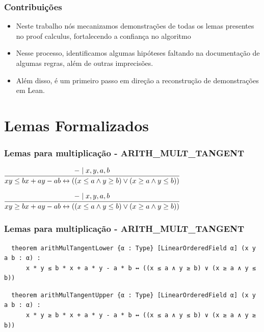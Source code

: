 \documentclass[usepdftitle=false,aspectratio=169,usenames,dvipsnames]{beamer}
\newcommand\vitem{\vfill\item}
\begin{document}
\begin{frame}
  \frametitle{Contribuições}
  \begin{itemize}
    \item Neste trabalho nós mecanizamos demonstrações de todas os lemas presentes no proof calculus, fortalecendo a confiança no algoritmo
    \vitem Nesse processo, identificamos algumas hipóteses faltando na documentação de algumas regras, além de outras imprecisões.
    \vitem Além disso, é um primeiro passo em direção a reconstrução de demonstrações em Lean.

  \end{itemize}
\end{frame}

\section{Lemas Formalizados}


\begin{frame}
  \frametitle{Lemas para multiplicação - ARITH\_MULT\_TANGENT}

\begin{center}
  $\infer[]{xy \le bx + ay - ab \leftrightarrow ((x \le a \land y \ge b) \lor (x \ge a \land y \le b))}{- \mid x, y, a, b}$
\end{center}

\begin{center}
  $\infer[]{xy \ge bx + ay - ab \leftrightarrow ((x \le a \land y \le b) \lor (x \ge a \land y \ge b))}{- \mid x, y, a, b}$
\end{center}

\end{frame}

\begin{frame}[fragile]
  \frametitle{Lemas para multiplicação - ARITH\_MULT\_TANGENT}

  \begin{lstlisting}
  theorem arithMulTangentLower {α : Type} [LinearOrderedField α] (x y a b : α) :
      x * y ≤ b * x + a * y - a * b ↔ ((x ≤ a ∧ y ≥ b) ∨ (x ≥ a ∧ y ≤ b))
  \end{lstlisting}

  \begin{lstlisting}
  theorem arithMulTangentUpper {α : Type} [LinearOrderedField α] (x y a b : α) :
      x * y ≥ b * x + a * y - a * b ↔ ((x ≤ a ∧ y ≤ b) ∨ (x ≥ a ∧ y ≥ b))
  \end{lstlisting}

\end{frame}
\end{document}
